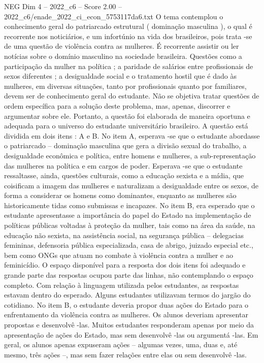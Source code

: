\begin{textsample}{NEG Dim 4 – 2022\_c6 – Score 2.00 – 2022\_c6/enade\_2022\_ci\_econ\_5753117da6.txt}
O tema contemplou o conhecimento geral do patriarcado estrutural ( dominação masculina ), o qual é recorrente nos noticiários, e um infortúnio na vida dos brasileiros, pois trata -se de uma questão de violência contra as mulheres.
É recorrente assistir ou ler notícias sobre o domínio masculino na sociedade brasileira.
Questões como a participação da mulher na política ; a paridade de salários entre profissionais de sexos diferentes ; a desigualdade social e o tratamento hostil que é dado às mulheres, em diversas situações, tanto por profissionais quanto por familiares, devem ser de conhecimento geral do estudante.
Não se objetiva tratar questões de ordem específica para a solução deste problema, mas, apenas, discorrer e argumentar sobre ele.
Portanto, a questão foi elaborada de maneira oportuna e adequada para o universo do estudante universitário brasileiro.
A questão está dividida em dois itens : A e B.
No item A, esperava -se que o estudante abordasse o patriarcado – dominação masculina que gera a divisão sexual do trabalho, a desigualdade econômica e política, entre homens e mulheres, a sub-representação das mulheres na política e em cargos de poder.
Esperava -se que o estudante ressaltasse, ainda, questões culturais, como a educação sexista e a mídia, que coisificam a imagem das mulheres e naturalizam a desigualdade entre os sexos, de forma a considerar os homens como dominantes, enquanto as mulheres são historicamente tidas como submissas e incapazes.
No item B, era esperado que o estudante apresentasse a importância do papel do Estado na implementação de políticas públicas voltadas à proteção da mulher, tais como na área da saúde, na educação não sexista, na assistência social, na segurança pública – delegacias femininas, defensoria pública especializada, casa de abrigo, juizado especial etc., bem como ONGs que atuam no combate à violência contra a mulher e ao feminicídio.
O espaço disponível para a resposta dos dois itens foi adequado e grande parte das respostas ocupou parte das linhas, não contemplando o espaço completo.
Com relação à linguagem utilizada pelos estudantes, as respostas estavam dentro do esperado.
Alguns estudantes utilizavam termos do jargão do cotidiano.
No item B, o estudante deveria propor duas ações do Estado para o enfrentamento da violência contra as mulheres.
Os alunos deveriam apresentar propostas e desenvolvê -las.
Muitos estudantes responderam apenas por meio da apresentação de ações do Estado, mas sem desenvolvê -las ou argumentá -las.
Em geral, os alunos apenas expuseram ações – algumas vezes, uma, duas e, até mesmo, três ações –, mas sem fazer relações entre elas ou sem desenvolvê -las.

\end{textsample}
